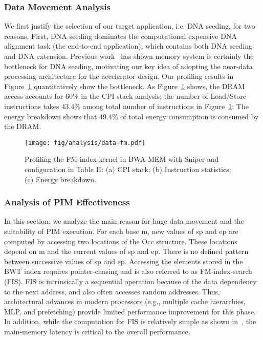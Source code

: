 \subsubsection{Data Movement Analysis}
We first justify the selection of our target application, i.e. DNA seeding, for two reasons. First, DNA seeding dominates the computational expensive DNA alignment task (the end-to-end application), which contains both DNA seeding and DNA extension. Previous work~\cite{yuanrong} has shown memory system is certainly the bottleneck for DNA seeding, motivating our key idea of adopting the near-data processing architecture for the accelerator design. Our profiling results in Figure~\ref{fig:data-fm} quantitatively show the bottleneck. As Figure~\ref{fig:data-fm} shows, the DRAM access accounts for 60\% in the CPI stack analysis; the number of Load/Store instructions takes 43.4\% among total number of instructions in Figure~\ref{fig:data-fm}; The energy breakdown shows that 49.4\% of total energy consumption is consumed by the DRAM.
\begin{figure}[htbp]
\centering
\texttt{[image: fig/analysis/data-fm.pdf]}
\caption{Profiling the FM-index kernel in BWA-MEM with Sniper and configuration in Table II: (a) CPI stack; (b) Instruction statistics; (c) Energy breakdown.}
\label{fig:data-fm}
\end{figure}


\subsubsection{Analysis of PIM Effectiveness}
In this section, we analyze the main reason for huge data movement and the suitability of PIM execution. For each base m, new values of sp and ep are computed by accessing two locations of the Occ structure. These locations depend on m and the current values of sp and ep. There is no defined pattern between successive values of sp and ep. Accessing the elements stored in the BWT index requires pointer-chasing and is also referred to as FM-index-search (FIS). FIS is intrinsically a sequential operation because of the data dependency to the next address, and also often accesses random addresses. Thus, architectural advances in modern processors (e.g., multiple cache hierarchies, MLP, and prefetching) provide limited performance improvement for this phase. In addition, while the computation for FIS is relatively simple as shown in~\cite{yuanrong}, the main-memory latency is critical to the overall performance.

